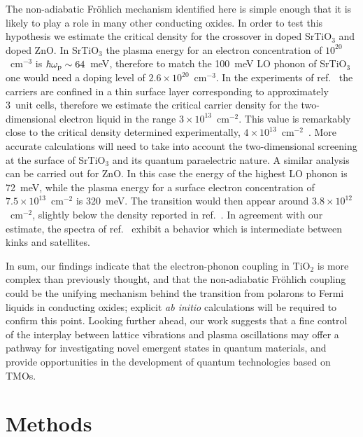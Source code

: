 \documentclass[12pt]{nature}
\begin{document}
The non-adiabatic Fr\"ohlich mechanism identified here is simple enough that it is likely to play
a role in many other conducting oxides. In order to test this hypothesis we estimate the critical 
density for the crossover in doped SrTiO$_3$\cite{Baumberger2016} and doped ZnO\cite{Yukawa2016}. 
In SrTiO$_3$ the plasma energy for an electron concentration of $10^{20}$~cm$^{-3}$ is 
$\hbar\omega_{\rm p}\sim64$~meV\cite{Gervais1993}, therefore to match the 100~meV LO phonon of 
SrTiO$_3$ one would need a doping level of $2.6\times10^{20}$~cm$^{-3}$. In the experiments 
of ref.~ the carriers are confined in a thin surface layer corresponding 
to approximately 3~unit cells, therefore we estimate the critical carrier density for the two-dimensional 
electron liquid in the range $3\times10^{13}$~cm$^{-2}$. This value is remarkably close to the 
critical density determined experimentally, $4\times10^{13}$~cm$^{-2}$~\cite{Baumberger2016}. 
More accurate calculations will need to take into account the two-dimensional screening at the 
surface of SrTiO$_3$ and its quantum paraelectric nature. 
A similar analysis can be carried out for ZnO\cite{Yukawa2016}. In this case the energy of the 
highest LO phonon is 72~meV, while the plasma energy for a surface electron concentration of 
$7.5\times10^{13}$~cm$^{-2}$ is 320~meV\cite{Goldstein1982}. The transition would then appear 
around $3.8\times10^{12}$~cm$^{-2}$, slightly below the density reported in ref.~. 
In agreement with our estimate, the spectra of ref.~ exhibit a behavior 
which is intermediate between kinks and satellites. 

In sum, our findings indicate that the electron-phonon coupling in TiO$_2$ is more complex than previously 
thought, and that the non-adiabatic Fr\"ohlich coupling could be the unifying mechanism behind the 
transition from polarons to Fermi liquids in conducting oxides; explicit {\it ab initio} calculations 
will be required to confirm this point. Looking further ahead, our work suggests that a fine control 
of the interplay between lattice vibrations and plasma oscillations may offer a 
pathway for investigating novel emergent states in quantum materials, and provide 
opportunities in the development of quantum technologies based on TMOs.

\vspace{10pt}

\section*{\textsf{Methods}} 
\end{document}
